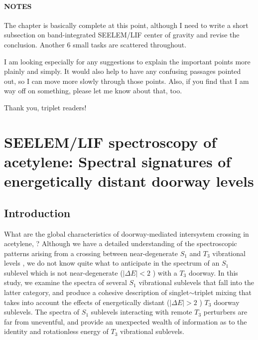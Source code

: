 \documentclass[12pt]{mitthesis}
\begin{document}
\tableofcontents
\clearpage

\listoffigures
\clearpage

\subsubsection*{NOTES}
The chapter is basically complete at this point, although I need to
write a short subsection on band-integrated SEELEM/LIF center of
gravity and revise the conclusion.  Another 6 small tasks are
scattered throughout.

I am looking especially for any suggestions to explain the important
points more plainly and simply.  It would also help to have any
confusing passages pointed out, so I can move more slowly through
those points.  Also, if you find that I am way off on something,
please let me know about that, too.

Thank you, triplet readers!

\clearpage

\setcounter{chapter}{3}
\chapter{SEELEM/LIF spectroscopy of acetylene: Spectral signatures of
  energetically distant doorway levels}

\section{Introduction}

What are the global characteristics of doorway-mediated intersystem
crossing in acetylene, ?  Although we have a detailed
understanding of the spectroscopic patterns arising from a crossing
between near-degenerate $S_1$ and $T_3$ vibrational levels
\cite{humphrey97, altunata00, altunata01, mishra04}, we do not know
quite what to anticipate in the spectrum of an $S_1$ sublevel which is
not near-degenerate ($\lvert \Delta E \rvert < 2$ \rcm) with a $T_3$
doorway.  In this study, we examine the spectra of several $S_1$
vibrational sublevels that fall into the latter category, and produce
a cohesive description of singlet$\sim$triplet mixing that takes into
account the effects of energetically distant ($\lvert \Delta E \rvert
> 2$ \rcm) $T_3$ doorway sublevels.  The spectra of $S_1$ sublevels
interacting with remote $T_3$ perturbers are far from uneventful, and
provide an unexpected wealth of information as to the identity and
rotationless energy of $T_3$ vibrational sublevels.
\end{document}
